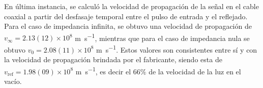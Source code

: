 En última instancia, se calculó la velocidad de propagación de la señal en el cable coaxial a partir del desfasaje temporal entre el pulso de entrada y el reflejado. Para el caso de impedancia infinita, se obtuvo una velocidad de propagación de \(v_{\infty} = 2.13(12) \times 10^8\) \si{\meter\per\second}, mientras que para el caso de impedancia nula se obtuvo \(v_0 = 2.08(11) \times 10^8\) \si{\meter\per\second}. Estos valores son consistentes entre sí y con la velocidad de propagación brindada por el fabricante, siendo esta de \(v_{\text{ref}} = 1.98(09) \times 10^8\) \si{\meter\per\second}, es decir el $66\%$ de la velocidad de la luz en el vacío.